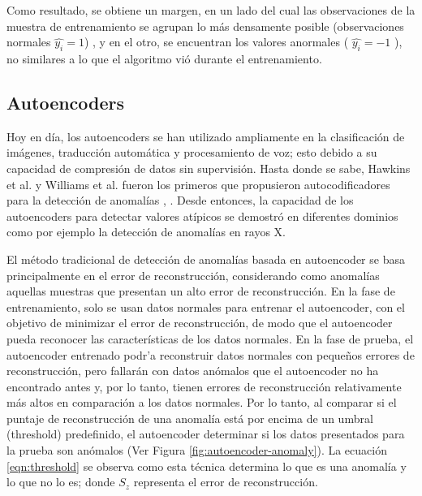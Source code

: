 Como resultado, se obtiene un margen, en un lado del cual las observaciones de la muestra de entrenamiento se agrupan lo más densamente posible (observaciones normales $\hat{y_{i}} = 1$) , y en el otro, se encuentran los valores anormales ( $\hat{y_{i}} = -1$ ), no similares a lo que el algoritmo vi\'{o} durante el entrenamiento.

\subsection{Autoencoders}

Hoy en día, los autoencoders se han utilizado ampliamente en la clasificación de imágenes, traducción automática y procesamiento de voz; esto debido a su capacidad de compresión de datos sin supervisión. Hasta donde se sabe, Hawkins et al. y Williams et al. fueron los primeros que propusieron autocodificadores para la detección de anomalías \cite{57}, \cite{58}. Desde entonces, la capacidad de los autoencoders para detectar valores at\'{i}picos se demostró en diferentes dominios como por ejemplo la detecci\'{o}n de anomal\'{i}as en rayos X.

\vspace{5mm} %

El m\'{e}todo tradicional de detecci\'{o}n de anomal\'{i}as basada en autoencoder se basa principalmente en el error de reconstrucci\'{o}n, considerando como anomal\'{i}as aquellas muestras que presentan un alto error de reconstrucci\'{o}n. En la fase de entrenamiento, solo se usan datos normales para entrenar el autoencoder, con el objetivo de minimizar el error de reconstrucci\'{o}n, de modo que el autoencoder pueda reconocer las caracter\'{i}sticas de los datos normales. En la fase de prueba, el autoencoder entrenado podr'{a} reconstruir datos normales con peque\~{n}os errores de reconstrucci\'{o}n, pero fallar\'{a}n con datos an\'{o}malos que el autoencoder no ha encontrado antes y, por lo tanto, tienen errores de reconstrucci\'{o}n relativamente m\'{a}s altos en comparaci\'{o}n a los datos normales. Por lo tanto, al comparar si el puntaje de reconstrucci\'{o}n de una anomal\'{i}a est\'{a} por encima de un umbral (threshold) predefinido, el autoencoder determinar si los datos presentados para la prueba son an\'{o}malos \cite{47} (Ver Figura \ref{fig:autoencoder-anomaly}). La ecuaci\'{o}n \ref{eqn:threshold} se observa como esta t\'{e}cnica determina lo que es una anomal\'{i}a y lo que no lo es; donde $S_{z}$ representa el error de reconstrucci\'{o}n.

